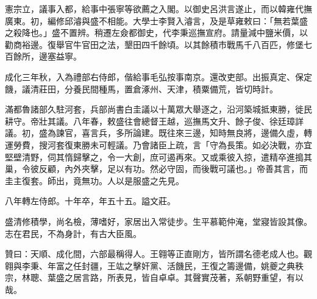 \begin{pinyinscope}
憲宗立，議事入都，給事中張寧等欲薦之入閣。以御史呂洪言遂止，而以韓雍代撫廣東。初，編修邱濬與盛不相能。大學士李賢入濬言，及是草雍敕曰：「無若葉盛之殺降也。」盛不置辨。稍遷左僉都御史，代李秉巡撫宣府。請量減中鹽米價，以勸商裕邊。復舉官牛官田之法，墾田四千餘頃。以其餘積市戰馬千八百匹，修堡七百餘所，邊塞益寧。

成化三年秋，入為禮部右侍郎，偕給事毛弘按事南京。還改吏部。出振真定、保定饑，議清莊田，分養民間種馬，置倉涿州、天津，積粟備荒，皆切時計。

滿都魯諸部久駐河套，兵部尚書白圭議以十萬眾大舉逐之，沿河築城抵東勝，徙民耕守。帝壯其議。八年春，敕盛往會總督王越，巡撫馬文升、餘子俊、徐廷璋詳議。初，盛為諫官，喜言兵，多所論建。既往來三邊，知時無良將，邊備久虛，轉運勞費，搜河套復東勝未可輕議。乃會諸臣上疏，言「守為長策。如必決戰，亦宜堅壁清野，伺其惰歸擊之，令一大創，庶可遏再來。又或乘彼入掠，遣精卒進搗其巢，令彼反顧，內外夾擊，足以有功。然必守固，而後戰可議也。」帝善其言，而圭主復套。師出，竟無功。人以是服盛之先見。

八年轉左侍郎。十年卒，年五十五。謚文莊。

盛清修積學，尚名檢，薄嗜好，家居出入常徒步。生平慕範仲淹，堂寢皆設其像。志在君民，不為身計，有古大臣風。

贊曰：天順、成化間，六部最稱得人。王翱等正直剛方，皆所謂名德老成人也。觀翱與李秉、年富之任封疆，王竑之擊奸黨、活饑民，王復之籌邊備，姚夔之典秩宗，林聰、葉盛之居言路，所表見，皆自卓卓。其聲實茂著，系朝野重望，有以哉。


\end{pinyinscope}